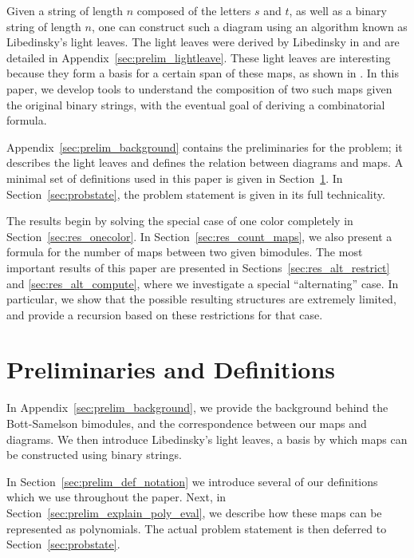 Given a string of length $n$ composed of the letters $s$ and $t$, as well as a binary string of length $n$, one can construct such a diagram using an algorithm known as Libedinsky's light leaves.  The light leaves were derived by Libedinsky in \cite{ref:Lib} and are detailed in Appendix~\ref{sec:prelim_lightleave}.  
These light leaves are interesting because they form a basis for a certain span of these maps, as shown in \cite{ref:gr4all}.
In this paper, we develop tools to understand the composition of two such maps given the original binary strings, with the eventual goal of deriving a combinatorial formula.

Appendix~\ref{sec:prelim_background} contains the preliminaries for the problem; it describes the light leaves and defines the relation between diagrams and maps.  A minimal set of definitions used in this paper is given in Section~\ref{sec:prelim}.  
In Section~\ref{sec:probstate}, the problem statement is given in its full technicality.

The results begin by solving the special case of one color completely in Section~\ref{sec:res_onecolor}.  In Section~\ref{sec:res_count_maps}, we also present a formula for the number of maps between two given bimodules.  The most important results of this paper are presented in Sections~\ref{sec:res_alt_restrict} and \ref{sec:res_alt_compute}, where we investigate a special ``alternating'' case.  In particular, we show that the possible resulting structures are extremely limited, and provide a recursion based on these restrictions for that case.

\section{Preliminaries and Definitions}
\label{sec:prelim}
In Appendix~\ref{sec:prelim_background}, we provide the background behind the Bott-Samelson bimodules, and the correspondence between our maps and diagrams.  We then introduce Libedinsky's light leaves, a basis by which maps can be constructed using binary strings.

In Section~\ref{sec:prelim_def_notation} we introduce several of our definitions which we use throughout the paper.  Next, in Section~\ref{sec:prelim_explain_poly_eval}, we describe how these maps can be represented as polynomials.  The actual problem statement is then deferred to Section~\ref{sec:probstate}.
